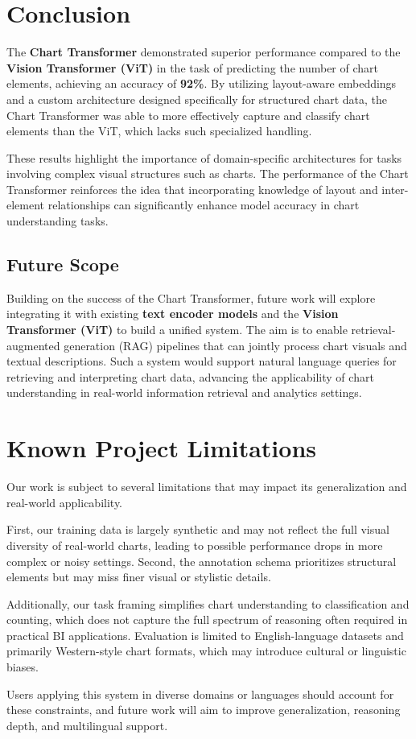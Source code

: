 \documentclass[11pt]{article}
\begin{document}
\section{Conclusion} 
The \textbf{Chart Transformer} demonstrated superior performance compared to the \textbf{Vision Transformer (ViT)} in the task of predicting the number of chart elements, achieving an accuracy of \textbf{92\%}. By utilizing layout-aware embeddings and a custom architecture designed specifically for structured chart data, the Chart Transformer was able to more effectively capture and classify chart elements than the ViT, which lacks such specialized handling.

These results highlight the importance of domain-specific architectures for tasks involving complex visual structures such as charts. The performance of the Chart Transformer reinforces the idea that incorporating knowledge of layout and inter-element relationships can significantly enhance model accuracy in chart understanding tasks.

\subsection*{Future Scope}

Building on the success of the Chart Transformer, future work will explore integrating it with existing \textbf{text encoder models} and the \textbf{Vision Transformer (ViT)} to build a unified system. The aim is to enable retrieval-augmented generation (RAG) pipelines that can jointly process chart visuals and textual descriptions. Such a system would support natural language queries for retrieving and interpreting chart data, advancing the applicability of chart understanding in real-world information retrieval and analytics settings.


\section{Known Project Limitations}

Our work is subject to several limitations that may impact its generalization and real-world applicability.

First, our training data is largely synthetic and may not reflect the full visual diversity of real-world charts, leading to possible performance drops in more complex or noisy settings. Second, the annotation schema prioritizes structural elements but may miss finer visual or stylistic details.

Additionally, our task framing simplifies chart understanding to classification and counting, which does not capture the full spectrum of reasoning often required in practical BI applications. Evaluation is limited to English-language datasets and primarily Western-style chart formats, which may introduce cultural or linguistic biases.

Users applying this system in diverse domains or languages should account for these constraints, and future work will aim to improve generalization, reasoning depth, and multilingual support.



\appendix
\end{document}
